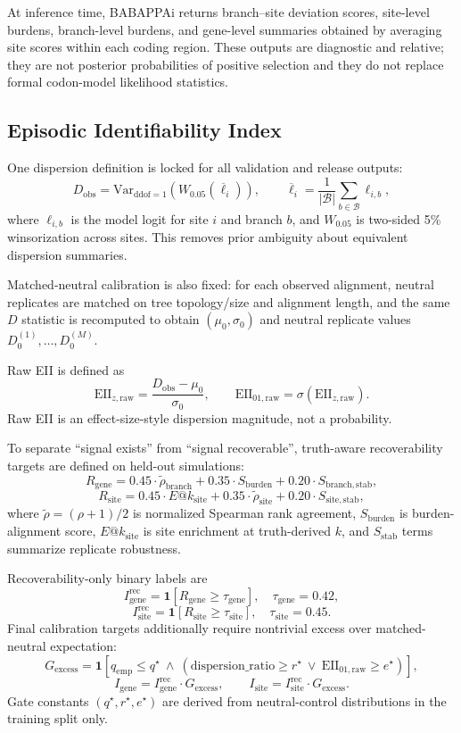 \documentclass[11pt]{article}
\begin{document}
At inference time, BABAPPAi returns branch--site deviation scores, site-level burdens, branch-level burdens, and gene-level summaries obtained by averaging site scores within each coding region. These outputs are diagnostic and relative; they are not posterior probabilities of positive selection and they do not replace formal codon-model likelihood statistics.

\subsection{Episodic Identifiability Index}

One dispersion definition is locked for all validation and release outputs:
\[
D_{\mathrm{obs}}=\mathrm{Var}_{\mathrm{ddof}=1}\!\left(W_{0.05}(\overline{\ell}_i)\right), \qquad
\overline{\ell}_i=\frac{1}{|\mathcal{B}|}\sum_{b\in\mathcal{B}}\ell_{i,b},
\]
where $\ell_{i,b}$ is the model logit for site $i$ and branch $b$, and $W_{0.05}$ is two-sided 5\% winsorization across sites. This removes prior ambiguity about equivalent dispersion summaries.

Matched-neutral calibration is also fixed: for each observed alignment, neutral replicates are matched on tree topology/size and alignment length, and the same $D$ statistic is recomputed to obtain $(\mu_0,\sigma_0)$ and neutral replicate values $D_0^{(1)},\ldots,D_0^{(M)}$.

Raw EII is defined as
\[
\mathrm{EII}_{z,\mathrm{raw}}=\frac{D_{\mathrm{obs}}-\mu_0}{\sigma_0}, \qquad
\mathrm{EII}_{01,\mathrm{raw}}=\sigma\!\left(\mathrm{EII}_{z,\mathrm{raw}}\right).
\]
Raw EII is an effect-size-style dispersion magnitude, not a probability.

To separate ``signal exists'' from ``signal recoverable'', truth-aware recoverability targets are defined on held-out simulations:
\[
R_{\mathrm{gene}}=0.45\cdot \widetilde{\rho}_{\mathrm{branch}}
+0.35\cdot S_{\mathrm{burden}}
+0.20\cdot S_{\mathrm{branch,stab}},
\]
\[
R_{\mathrm{site}}=0.45\cdot E@k_{\mathrm{site}}
+0.35\cdot \widetilde{\rho}_{\mathrm{site}}
+0.20\cdot S_{\mathrm{site,stab}},
\]
where $\widetilde{\rho}=(\rho+1)/2$ is normalized Spearman rank agreement, $S_{\mathrm{burden}}$ is burden-alignment score, $E@k_{\mathrm{site}}$ is site enrichment at truth-derived $k$, and $S_{\mathrm{stab}}$ terms summarize replicate robustness.

Recoverability-only binary labels are
\[
I_{\mathrm{gene}}^{\mathrm{rec}}=\mathbf{1}[R_{\mathrm{gene}}\ge \tau_{\mathrm{gene}}], \quad
\tau_{\mathrm{gene}}=0.42,
\]
\[
I_{\mathrm{site}}^{\mathrm{rec}}=\mathbf{1}[R_{\mathrm{site}}\ge \tau_{\mathrm{site}}], \quad
\tau_{\mathrm{site}}=0.45.
\]
Final calibration targets additionally require nontrivial excess over matched-neutral expectation:
\[
G_{\mathrm{excess}}=\mathbf{1}\!\left[q_{\mathrm{emp}}\le q^\star \ \wedge \
\left(\mathrm{dispersion\_ratio}\ge r^\star \ \vee\ \mathrm{EII}_{01,\mathrm{raw}}\ge e^\star\right)\right],
\]
\[
I_{\mathrm{gene}}=I_{\mathrm{gene}}^{\mathrm{rec}}\cdot G_{\mathrm{excess}}, \qquad
I_{\mathrm{site}}=I_{\mathrm{site}}^{\mathrm{rec}}\cdot G_{\mathrm{excess}}.
\]
Gate constants $(q^\star,r^\star,e^\star)$ are derived from neutral-control distributions in the training split only.
\end{document}
